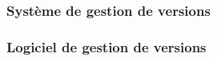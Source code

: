 \documentclass{beamer}
\begin{document}
  \begin{frame}
    \frametitle{Système de gestion de versions}

    \end{frame}
    \begin{frame}
      \frametitle{Logiciel de gestion de versions}

    \end{frame}
\end{document}
